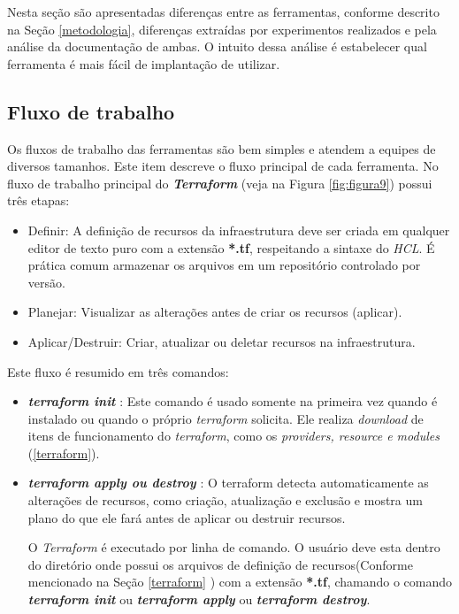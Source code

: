 Nesta seção são apresentadas diferenças entre as ferramentas, conforme descrito na Seção \ref{metodologia}, diferenças extraídas por experimentos realizados e pela análise da documentação de ambas. O intuito dessa análise é estabelecer qual ferramenta é mais fácil de implantação de utilizar.  


\subsection{Fluxo de trabalho}
Os fluxos de trabalho  das ferramentas são bem simples e atendem a equipes de diversos tamanhos. Este item descreve o fluxo principal de cada ferramenta. No fluxo de trabalho principal do \textbf {\textit{Terraform}} (veja na Figura \ref{fig:figura9}) possui três etapas: 

\begin{itemize}
  \item Definir: A definição de recursos da infraestrutura deve ser criada em qualquer editor de texto puro com a extensão \textbf{*.tf}, respeitando a sintaxe do \textit{HCL}. É prática comum armazenar os arquivos em um repositório controlado por versão.
   \item Planejar: Visualizar as alterações antes de criar os recursos (aplicar).
   \item Aplicar/Destruir: Criar, atualizar ou deletar recursos na infraestrutura. 
\end{itemize}


Este fluxo é resumido em três comandos: 


\begin{itemize}

\item \textbf{\textit{terraform init }}: Este comando é usado somente na primeira vez quando é instalado ou quando o próprio \textit{terraform} solicita. Ele realiza \textit{download} de itens de funcionamento do \textit{terraform}, como os \textit{providers, resource e modules} (\ref{terraform}). 

\item \textbf{\textit{terraform apply ou destroy }}: O terraform  detecta automaticamente as alterações de recursos, como criação, atualização e exclusão e mostra um plano do que ele fará antes de aplicar ou destruir recursos.

O \textit{Terraform} é executado por linha de comando. O usuário deve esta dentro do diretório onde possui os arquivos de definição de recursos(Conforme mencionado na Seção \ref{terraform} )  com a extensão \textbf{*.tf}, chamando o comando \textbf{\textit{terraform init}} ou \textbf{\textit{terraform apply}} ou \textbf{\textit{terraform destroy}}.  


\end{itemize}

